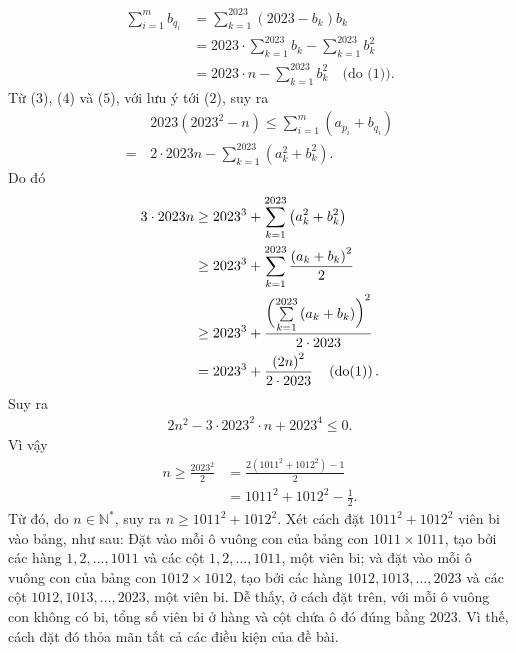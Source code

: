 \begin{multicols}{2}
\begin{align*}
		\sum\limits_{i = 1}^m {{b_{{q_i}}}}  &= \sum\limits_{k = 1}^{2023} {\left( {2023 - {b_k}} \right){b_k}}  \\
		&= 2023 \cdot \sum\limits_{k = 1}^{2023} {{b_k}}  - \sum\limits_{k = 1}^{2023} {b_k^2}  \\
		&= 2023 \cdot n - \sum\limits_{k = 1}^{2023} {b_k^2} \quad\text{(do ($1$))}. \tag{$5$}
	\end{align*}
	Từ ($3$), ($4$) và ($5$), với lưu ý tới ($2$), suy ra
	\begin{align*}
		&2023\left( {{{2023}^2} - n} \right) \le \sum\limits_{i = 1}^m {\left( {{a_{{p_i}}} + {b_{{q_i}}}} \right)}  \\
		= \,&2 \cdot 2023n - \sum\limits_{k = 1}^{2023} {\left( {a_k^2 + b_k^2} \right)} .
	\end{align*}
	Do đó
	\begin{align*}
			3 \cdot 2023n &\ge {2023^3} + \sum\limits_{k = 1}^{2023} {\left( {a_k^2 + b_k^2} \right)}  \\
			&\ge {2023^3} + \sum\limits_{k = 1}^{2023} {\frac{{{{\left( {{a_k} + {b_k}} \right)}^2}}}{2}} \\
			 &\ge {2023^3} + \frac{{{{\left( {\sum\limits_{k = 1}^{2023} {\left( {{a_k} + {b_k}} \right)} } \right)}^2}}}{{2 \cdot 2023}} \\
			 &= {2023^3} + \frac{{{{\left( {2n} \right)}^2}}}{{2 \cdot 2023}} \quad\left( {{\rm{do}}(1)} \right).
	\end{align*}
	Suy ra
	\begin{align*}
		2{n^2} - 3 \cdot {2023^2} \cdot n + {2023^4} \le 0.
	\end{align*}
	Vì vậy
	\begin{align*}
		n \ge \frac{{{{2023}^2}}}{2} &= \frac{{2\left( {{{1011}^2} + {{1012}^2}} \right) - 1}}{2} \\
		&= {1011^2} + {1012^2} - \frac{1}{2}.
	\end{align*}
	Từ đó, do $n \in \mathbb{N^*}$,  suy ra  $n \ge {1011^2} + {1012^2}$.
	\vskip 0.05cm
	Xét cách đặt $1011^2 + 1012^2$  viên bi vào bảng, như sau:
	\vskip 0.05cm
	Đặt vào mỗi ô vuông con của bảng con $1011 \times 1011$, tạo bởi các hàng $1, 2, \ldots, 1011$ và các cột $1, 2, \ldots, 1011$, một viên bi; và đặt vào mỗi ô vuông con của bảng con $1012 \times 1012$, tạo bởi các hàng $1012, 1013, \ldots, 2023$ và các cột $1012, 1013, \ldots, 2023$, một viên bi.
	\vskip 0.05cm
	Dễ thấy, ở cách đặt trên, với mỗi ô vuông con không có bi, tổng số viên bi ở hàng và cột chứa ô đó đúng bằng $2023$. Vì thế, cách đặt đó thỏa mãn tất cả các điều kiện của đề bài.

\end{multicols}
